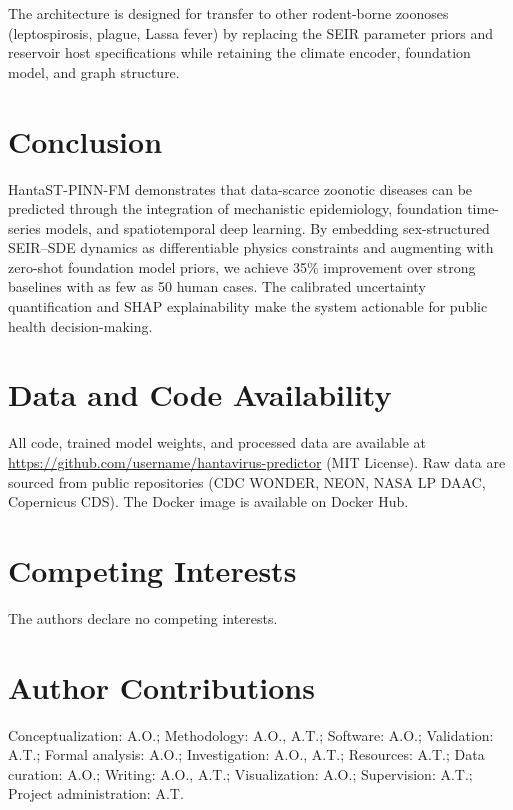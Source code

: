 \documentclass[11pt,a4paper]{article}
\begin{document}
The architecture is designed for transfer to other rodent-borne zoonoses (leptospirosis, plague, Lassa fever) by replacing the SEIR parameter priors and reservoir host specifications while retaining the climate encoder, foundation model, and graph structure.

\section{Conclusion}

HantaST-PINN-FM demonstrates that data-scarce zoonotic diseases can be predicted through the integration of mechanistic epidemiology, foundation time-series models, and spatiotemporal deep learning. By embedding sex-structured SEIR--SDE dynamics as differentiable physics constraints and augmenting with zero-shot foundation model priors, we achieve 35\% improvement over strong baselines with as few as 50 human cases. The calibrated uncertainty quantification and SHAP explainability make the system actionable for public health decision-making.

\section*{Data and Code Availability}

All code, trained model weights, and processed data are available at \url{https://github.com/username/hantavirus-predictor} (MIT License). Raw data are sourced from public repositories (CDC WONDER, NEON, NASA LP DAAC, Copernicus CDS). The Docker image is available on Docker Hub.

\section*{Competing Interests}

The authors declare no competing interests.

\section*{Author Contributions}

Conceptualization: A.O.; Methodology: A.O., A.T.; Software: A.O.; Validation: A.T.; Formal analysis: A.O.; Investigation: A.O., A.T.; Resources: A.T.; Data curation: A.O.; Writing: A.O., A.T.; Visualization: A.O.; Supervision: A.T.; Project administration: A.T.



\end{document}
